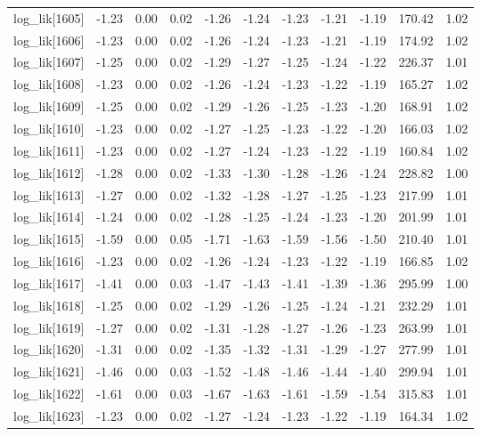 \begin{table}[ht]
\begin{tabular}{rrrrrrrrrrr}
  log\_lik[1605] & -1.23 & 0.00 & 0.02 & -1.26 & -1.24 & -1.23 & -1.21 & -1.19 & 170.42 & 1.02 \\ 
  log\_lik[1606] & -1.23 & 0.00 & 0.02 & -1.26 & -1.24 & -1.23 & -1.21 & -1.19 & 174.92 & 1.02 \\ 
  log\_lik[1607] & -1.25 & 0.00 & 0.02 & -1.29 & -1.27 & -1.25 & -1.24 & -1.22 & 226.37 & 1.01 \\ 
  log\_lik[1608] & -1.23 & 0.00 & 0.02 & -1.26 & -1.24 & -1.23 & -1.22 & -1.19 & 165.27 & 1.02 \\ 
  log\_lik[1609] & -1.25 & 0.00 & 0.02 & -1.29 & -1.26 & -1.25 & -1.23 & -1.20 & 168.91 & 1.02 \\ 
  log\_lik[1610] & -1.23 & 0.00 & 0.02 & -1.27 & -1.25 & -1.23 & -1.22 & -1.20 & 166.03 & 1.02 \\ 
  log\_lik[1611] & -1.23 & 0.00 & 0.02 & -1.27 & -1.24 & -1.23 & -1.22 & -1.19 & 160.84 & 1.02 \\ 
  log\_lik[1612] & -1.28 & 0.00 & 0.02 & -1.33 & -1.30 & -1.28 & -1.26 & -1.24 & 228.82 & 1.00 \\ 
  log\_lik[1613] & -1.27 & 0.00 & 0.02 & -1.32 & -1.28 & -1.27 & -1.25 & -1.23 & 217.99 & 1.01 \\ 
  log\_lik[1614] & -1.24 & 0.00 & 0.02 & -1.28 & -1.25 & -1.24 & -1.23 & -1.20 & 201.99 & 1.01 \\ 
  log\_lik[1615] & -1.59 & 0.00 & 0.05 & -1.71 & -1.63 & -1.59 & -1.56 & -1.50 & 210.40 & 1.01 \\ 
  log\_lik[1616] & -1.23 & 0.00 & 0.02 & -1.26 & -1.24 & -1.23 & -1.22 & -1.19 & 166.85 & 1.02 \\ 
  log\_lik[1617] & -1.41 & 0.00 & 0.03 & -1.47 & -1.43 & -1.41 & -1.39 & -1.36 & 295.99 & 1.00 \\ 
  log\_lik[1618] & -1.25 & 0.00 & 0.02 & -1.29 & -1.26 & -1.25 & -1.24 & -1.21 & 232.29 & 1.01 \\ 
  log\_lik[1619] & -1.27 & 0.00 & 0.02 & -1.31 & -1.28 & -1.27 & -1.26 & -1.23 & 263.99 & 1.01 \\ 
  log\_lik[1620] & -1.31 & 0.00 & 0.02 & -1.35 & -1.32 & -1.31 & -1.29 & -1.27 & 277.99 & 1.01 \\ 
  log\_lik[1621] & -1.46 & 0.00 & 0.03 & -1.52 & -1.48 & -1.46 & -1.44 & -1.40 & 299.94 & 1.01 \\ 
  log\_lik[1622] & -1.61 & 0.00 & 0.03 & -1.67 & -1.63 & -1.61 & -1.59 & -1.54 & 315.83 & 1.01 \\ 
  log\_lik[1623] & -1.23 & 0.00 & 0.02 & -1.27 & -1.24 & -1.23 & -1.22 & -1.19 & 164.34 & 1.02 \\ 

\end{tabular}
\end{table}
